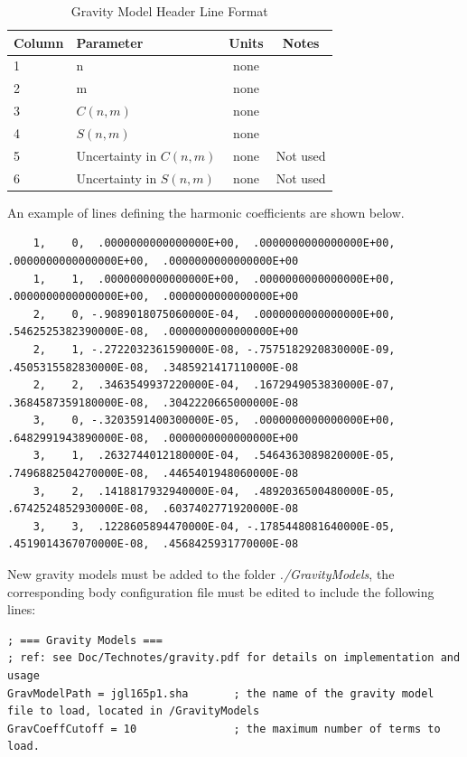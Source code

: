 \documentclass[a4paper]{article}
\begin{document}
\begin{table}[h]
\begin{tabular}{llcc}
Column	&Parameter                        				&Units      			& Notes     \\\hline
1		&n                							&none        			&           \\
2		&m 								&none 			&           \\
3		&$C(n,m)$							&none           		&  \\
4		&$S(n,m)$ 							&none           		&		\\
5		&Uncertainty in $C(n,m)$	 				&none				&Not used		\\
6		&Uncertainty in $S(n,m)$					&none				&Not used	
\end{tabular}
\caption{Gravity Model Header Line Format}
\label{tab:coefflinefmat}
\end{table}



An example of lines defining the harmonic coefficients are shown below.
\begin{tiny}
\begin{verbatim}
    1,    0,  .0000000000000000E+00,  .0000000000000000E+00,  .0000000000000000E+00,  .0000000000000000E+00             
    1,    1,  .0000000000000000E+00,  .0000000000000000E+00,  .0000000000000000E+00,  .0000000000000000E+00             
    2,    0, -.9089018075060000E-04,  .0000000000000000E+00,  .5462525382390000E-08,  .0000000000000000E+00             
    2,    1, -.2722032361590000E-08, -.7575182920830000E-09,  .4505315582830000E-08,  .3485921417110000E-08             
    2,    2,  .3463549937220000E-04,  .1672949053830000E-07,  .3684587359180000E-08,  .3042220665000000E-08             
    3,    0, -.3203591400300000E-05,  .0000000000000000E+00,  .6482991943890000E-08,  .0000000000000000E+00             
    3,    1,  .2632744012180000E-04,  .5464363089820000E-05,  .7496882504270000E-08,  .4465401948060000E-08             
    3,    2,  .1418817932940000E-04,  .4892036500480000E-05,  .6742524852930000E-08,  .6037402771920000E-08             
    3,    3,  .1228605894470000E-04, -.1785448081640000E-05,  .4519014367070000E-08,  .4568425931770000E-08             
\end{verbatim}
\end{tiny}
New gravity models must be added to the folder \emph{./GravityModels}, the corresponding body configuration file must be edited to include the following lines:
\begin{tiny}
\begin{verbatim}
; === Gravity Models ===
; ref: see Doc/Technotes/gravity.pdf for details on implementation and usage
GravModelPath = jgl165p1.sha       ; the name of the gravity model file to load, located in /GravityModels
GravCoeffCutoff = 10               ; the maximum number of terms to load.
\end{verbatim}
\end{tiny}
\end{document}
